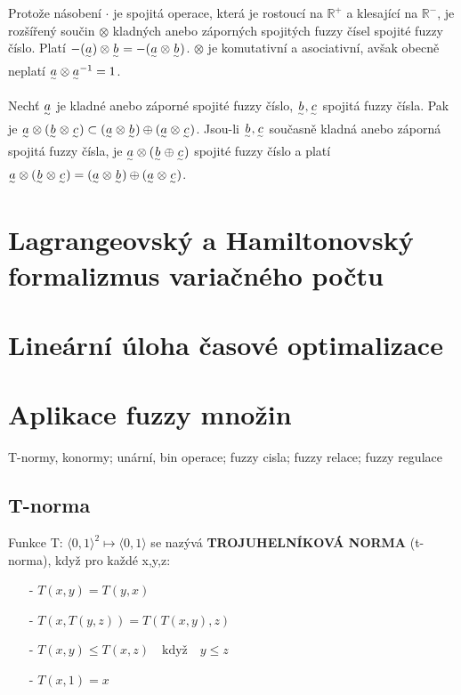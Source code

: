 {\begin{dusledek}
Protože násobení $\cdot$ je spojitá operace, která je rostoucí na $\mathbb{R}^+$ a klesající na $\mathbb{R}^-$, je rozšířený součin $\otimes$ kladných anebo záporných spojitých fuzzy čísel spojité fuzzy číslo. Platí $-(\underset{^\sim}a) \otimes \underset{^\sim}b = -(\underset{^\sim}a \otimes \underset{^\sim}b)$. $\otimes$ je komutativní a asociativní, avšak obecně neplatí $\underset{^\sim}a \otimes \underset{^\sim}a^{-1} = 1$.
\end{dusledek}

\begin{theorem}
Nechť $\underset{^\sim}a$ je kladné anebo záporné spojité fuzzy číslo, $\underset{^\sim}b, \underset{^\sim}c$ spojitá fuzzy čísla. Pak je $\underset{^\sim}a \otimes (\underset{^\sim}b \otimes \underset{^\sim}c) \subset (\underset{^\sim}a \otimes \underset{^\sim}b) \oplus (\underset{^\sim}a \otimes \underset{^\sim}c)$. Jsou-li $\underset{^\sim}b, \underset{^\sim}c$ současně kladná anebo záporná spojitá fuzzy čísla, je $\underset{^\sim}a \otimes (\underset{^\sim}b \oplus \underset{^\sim}c)$ spojité fuzzy číslo a platí $\underset{^\sim}a \otimes (\underset{^\sim}b \otimes \underset{^\sim}c) = (\underset{^\sim}a \otimes \underset{^\sim}b) \oplus (\underset{^\sim}a \otimes \underset{^\sim}c)$.
\end{theorem}

\section{Lagrangeovský a Hamiltonovský formalizmus variačného počtu}

\section{Lineární úloha časové optimalizace}

\section{Aplikace fuzzy množin}
T-normy, konormy; unární, bin operace; fuzzy cisla; fuzzy relace; fuzzy regulace
\subsection{T-norma}
Funkce T: $\langle0,1\rangle^2\mapsto\langle0,1\rangle$ se nazývá \textbf{TROJUHELNÍKOVÁ NORMA} (t-norma), když pro každé x,y,z: 

\begin{itemize}
\item[-]{$T(x,y)=T(y,x)$}
\item[-]{$T(x,T(y,z))=T(T(x,y),z)$}
\item[-]{$T(x,y)\leq T(x,z)\quad \text{když} \quad y\leq z$}
\item[-]{$T(x,1)=x$}
\end{itemize}

}
